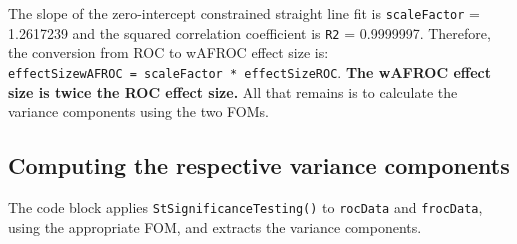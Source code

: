\documentclass[
]{book}
\newenvironment{Shaded}{\begin{snugshade}}{\end{snugshade}}
\newcommand{\AttributeTok}[1]{\textcolor[rgb]{0.77,0.63,0.00}{#1}}
\newcommand{\CommentTok}[1]{\textcolor[rgb]{0.56,0.35,0.01}{\textit{#1}}}
\newcommand{\DecValTok}[1]{\textcolor[rgb]{0.00,0.00,0.81}{#1}}
\newcommand{\FloatTok}[1]{\textcolor[rgb]{0.00,0.00,0.81}{#1}}
\newcommand{\FunctionTok}[1]{\textcolor[rgb]{0.00,0.00,0.00}{#1}}
\newcommand{\NormalTok}[1]{#1}
\newcommand{\OtherTok}[1]{\textcolor[rgb]{0.56,0.35,0.01}{#1}}
\newcommand{\SpecialCharTok}[1]{\textcolor[rgb]{0.00,0.00,0.00}{#1}}
\newcommand{\StringTok}[1]{\textcolor[rgb]{0.31,0.60,0.02}{#1}}
\begin{document}
\begin{Shaded}
\end{Shaded}

The slope of the zero-intercept constrained straight line fit is \texttt{scaleFactor} = 1.2617239 and the squared correlation coefficient is \texttt{R2} = 0.9999997. Therefore, the conversion from ROC to wAFROC effect size is: \texttt{effectSizewAFROC\ =\ scaleFactor\ *\ effectSizeROC}. \textbf{The wAFROC effect size is twice the ROC effect size.} All that remains is to calculate the variance components using the two FOMs.

\hypertarget{computing-the-respective-variance-components}{%
\subsection{Computing the respective variance components}\label{computing-the-respective-variance-components}}

The code block applies \texttt{StSignificanceTesting()} to \texttt{rocData} and \texttt{frocData}, using the appropriate FOM, and extracts the variance components.

\begin{Shaded}
\end{Shaded}
\end{document}

